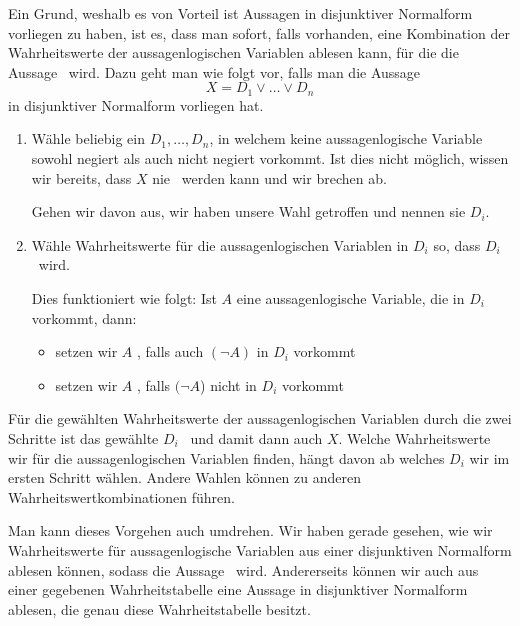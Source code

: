 \documentclass[../../main.tex]{subfiles}
\begin{document}
    Ein Grund, weshalb es von Vorteil ist Aussagen in disjunktiver Normalform
    vorliegen zu haben, ist es, dass man sofort, falls vorhanden, 
    eine Kombination der Wahrheitswerte der aussagenlogischen
    Variablen ablesen kann, für die die Aussage \wahr\ wird. 
    Dazu geht man wie folgt vor, falls man 
    die Aussage
    \[X= D_1 \lor \dots \lor D_n\]
    in disjunktiver Normalform vorliegen hat.
    \begin{enumerate}
        \item Wähle beliebig ein $D_1,\dots,D_n$, in welchem keine 
        aussagenlogische Variable sowohl negiert als auch nicht negiert vorkommt. 
        Ist dies nicht möglich, wissen wir bereits, dass $X$ nie \wahr\ werden kann 
        und wir brechen ab.
        
        Gehen wir davon aus, wir haben unsere Wahl getroffen und nennen sie $D_i$.
        \item Wähle Wahrheitswerte für die aussagenlogischen 
        Variablen in $D_i$ so, dass $D_i$ \wahr\  wird.
        
        Dies funktioniert wie folgt: Ist $A$ eine aussagenlogische Variable, die in $D_i$ vorkommt, dann:
            \begin{itemize}
                \item setzen wir $A$ \falsch, falls auch $(\lnot A)$ in $D_i$ vorkommt
                \item setzen wir $A$ \wahr, falls $(\lnot A$) nicht in $D_i$ vorkommt
            \end{itemize}
        
    \end{enumerate}
   
    Für die gewählten Wahrheitswerte der aussagenlogischen Variablen durch die zwei 
    Schritte ist das gewählte $D_i$ \wahr\ und damit dann auch $X$. Welche 
    Wahrheitswerte wir für die aussagenlogischen Variablen finden, hängt davon ab
    welches $D_i$ wir im ersten Schritt wählen. Andere Wahlen können zu anderen 
    Wahrheitswertkombinationen führen.

    Man kann dieses Vorgehen auch umdrehen. Wir haben gerade gesehen, 
    wie wir Wahrheitswerte für aussagenlogische Variablen
    aus einer disjunktiven Normalform ablesen können, sodass die Aussage \wahr\ wird. Andererseits können wir auch 
    aus einer gegebenen Wahrheitstabelle eine Aussage in disjunktiver Normalform ablesen,
    die genau diese Wahrheitstabelle besitzt.
\end{document}

